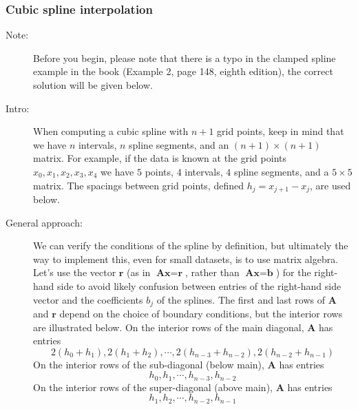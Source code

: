\documentclass[11pt]{article}
\begin{document}
\subsubsection{Cubic spline interpolation}
\begin{description}
\item[Note:] Before you begin, please note that there is a typo in the clamped spline example in the book (Example 2, page 148, eighth edition), the correct solution will be given below.

\item[Intro:] When computing a cubic spline with \(n+1\) grid points, keep in mind that we have \(n\) intervals, \(n\) spline segments, and an \((n+1)\times (n+1)\) matrix. For example, if the data is known at the grid points \(x_0, x_1, x_2, x_3, x_4\) we have \(5\) points, \(4\) intervals, \(4\) spline segments, and a \(5\times5\) matrix. The spacings between grid points, defined \(h_j = x_{j+1} - x_j\), are used below.

\item[General approach:] We can verify the conditions of the spline by definition, but ultimately the way to implement this, even for small datasets, is to use matrix algebra. Let's use the vector \(\mathbf{r}\) (as in \(\textbf{A}\textbf{x} = \textbf{r}\), rather than \(\textbf{A}\textbf{x} = \textbf{b}\)) for the right-hand side to avoid likely confusion between entries of the right-hand side vector and the coefficients \(b_j\) of the splines. The first and last rows of \(\mathbf{A}\) and \(\mathbf{r}\) depend on the choice of boundary conditions, but the interior rows are illustrated below. On the interior rows of the main diagonal, \(\mathbf{A}\) has entries \[2(h_0+h_1), 2(h_1 + h_2), \cdots, 2(h_{n-3} + h_{n-2}), 2(h_{n-2} + h_{n-1})\] On the interior rows of the sub-diagonal (below main), \(\mathbf{A}\) has entries \[h_0, h_1, \cdots, h_{n-3}, h_{n-2}\] On the interior rows of the super-diagonal (above main), \(\mathbf{A}\) has entries \[h_1, h_2, \cdots, h_{n-2}, h_{n-1}\] 


\end{description}
\end{document}
